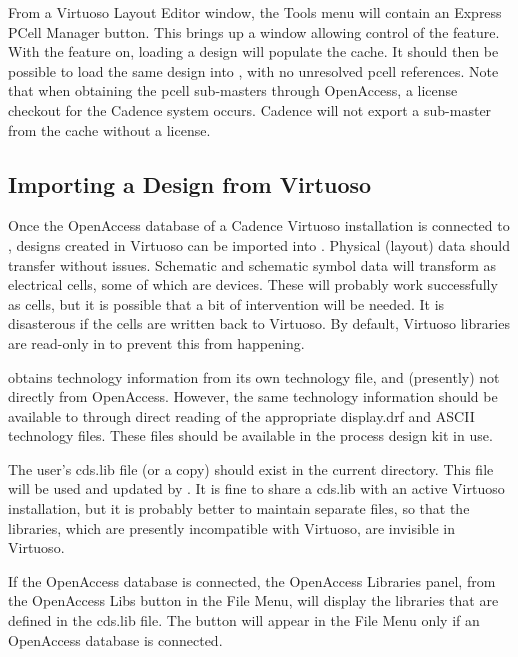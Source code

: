 From a Virtuoso Layout Editor window, the {\cb Tools} menu will
contain an {\cb Express PCell Manager} button.  This brings up a
window allowing control of the feature.  With the feature on, loading
a design will populate the cache.  It should then be possible to load
the same design into {\Xic}, with no unresolved pcell references. 
Note that when obtaining the pcell sub-masters through OpenAccess, a
license checkout for the Cadence system occurs.  Cadence will not
export a sub-master from the cache without a license.


\subsection{Importing a Design from Virtuoso}

Once the OpenAccess database of a Cadence Virtuoso installation is
connected to {\Xic}, designs created in Virtuoso can be imported
into {\Xic}.  Physical (layout) data should transfer without issues. 
Schematic and schematic symbol data will transform as electrical
cells, some of which are devices.  These will probably work
successfully as {\Xic} cells, but it is possible that a bit of
intervention will be needed.  It is disasterous if the cells are
written back to Virtuoso.  By default, Virtuoso libraries are
read-only in {\Xic} to prevent this from happening.

{\Xic} obtains technology information from its own technology file,
and (presently) not directly from OpenAccess.  However, the same
technology information should be available to {\Xic} through direct
reading of the appropriate {\vt display.drf} and ASCII technology
files.  These files should be available in the process design kit in
use.

The user's {\vt cds.lib} file (or a copy) should exist in the current
directory.  This file will be used and updated by {\Xic}.  It is fine
to share a {\vt cds.lib} with an active Virtuoso installation, but it
is probably better to maintain separate files, so that the {\Xic}
libraries, which are presently incompatible with Virtuoso, are
invisible in Virtuoso.

If the OpenAccess database is connected, the {\cb OpenAccess
Libraries} panel, from the {\cb OpenAccess Libs} button in the {\cb
File Menu}, will display the libraries that are defined in the {\vt
cds.lib} file.  The button will appear in the {\cb File Menu} only if
an OpenAccess database is connected.

